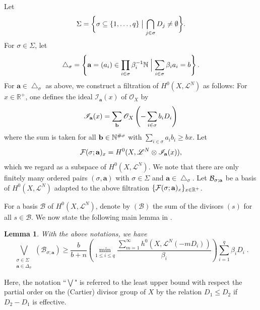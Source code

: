 \documentclass[10pt]{amsart}
\numberwithin{equation}{section}
\theoremstyle{plain}
\newtheorem{lemma}[theorem]{Lemma}
\theoremstyle{definition}
\begin{document}
Let
$$\Sigma
  = \biggl\{\sigma\subseteq \{1,\dots,q\}
    \bigm| \bigcap_{j\in \sigma}  D_j\ne\emptyset\biggr\}.$$
For $\sigma\in \Sigma$, let
$$\bigtriangleup_{\sigma}
  = \left\{\mathbf a = (a_i)\in \prod_{i\in\sigma}\beta_i^{-1}\mathbb N
    \Bigm| \sum_{i\in\sigma} \beta_ia_i = b \right\}.$$
For $\mathbf a\in\bigtriangleup_{\sigma}$ as above, we construct a filtration of $H^0(X, \mathscr L^N)$ as follows: 
For  $x\in  \mathbb R^+$, 
one defines  
the ideal ${\mathscr I}_{\mathbf a}(x)$ of ${\mathscr O}_X$ by
\begin{equation}\label{def_I_of_x}
  {\mathscr I}_{\mathbf a}(x)
  = \sum_{{\bf b}} {\mathscr O}_X\left(-\sum_{i\in \sigma} b_iD_{i}\right)
\end{equation}
where the sum is taken for all ${\bf b}\in {\mathbb N}^{\#\sigma}$
with $\sum_{i\in \sigma} a_ib_i\ge bx$. Let
\begin{equation}\label{filtrationof_x}{\mathcal F}(\sigma; {\bf a})_x
  = H^0(X, \mathscr L^N \otimes {{\mathscr I}_{\mathbf a}}(x)),
  \end{equation}
which we regard as a subspace of $H^0(X,\mathscr L^N)$.
We note that there are only finitely many ordered pairs
$(\sigma,\mathbf a)$ with $\sigma\in\Sigma$
and $\mathbf a\in\bigtriangleup_\sigma$.  Let $\mathcal B_{\sigma; {\bf a}}$ be a basis of
$H^0(X, \mathscr L^N)$ adapted to the above filtration $\{{\mathcal F}(\sigma; {\bf a})_x\}_{x\in\mathbb R^+}$.

  For a basis ${\mathcal B}$ of $H^0(X, {\mathscr L}^N)$, denote by $(\mathcal B)$  the sum of the divisors $(s)$
for all $s\in\mathcal B$.  
We now state the following main lemma in \cite{RV20}.%

\begin{lemma}\label{aut_main_lemma} {\cite[Lemma 6.8]{RV20}}
With the above notations, we have
\begin{equation}\label{aut_main_step}
  \bigvee_{\substack{\sigma\in\Sigma \\ \mathbf a\in\Delta_\sigma}}
      (\mathcal B_{\sigma;\mathbf a})
    \ge \frac b{b+n}\left(\min_{1\le i\le q}
      \frac{\sum_{m=1}^\infty h^0(X,\mathscr L^N(-mD_i))}{\beta_i}\right)
      \sum_{i=1}^q \beta_iD_i\;.
\end{equation}
\end{lemma}
Here, the notation ``$\bigvee$" is referred to the least upper bound with respect the partial order on the (Cartier) divisor group of $X$  by the relation $D_1\le D_2$ if $D_2-D_1$ is effective.
\end{document}
